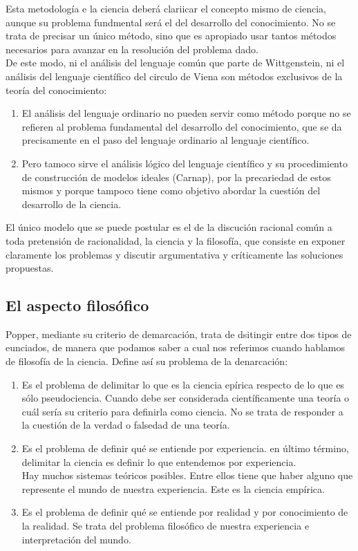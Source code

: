 \documentclass[a4paper, 11pt, twocolumn, spanish]{article}
\begin{document}
Esta metodología e la ciencia deberá clariicar el concepto mismo de
ciencia, aunque su problema fundmental será el del desarrollo del
conocimiento. No se trata de precisar un único método, sino que es
apropiado usar tantos métodos necesarios para avanzar en la resolución
del problema dado.\\
De este modo, ni el análisis del lenguaje común que parte de
Wittgenstein, ni el análisis del lenguaje científico del circulo de
Viena son métodos exclusivos de la teoría del conocimiento:
\begin{enumerate}
\item El análisis del lenguaje ordinario no pueden servir como método
porque no se refieren al problema fundamental del desarrollo del
conocimiento, que se da precisamente en el paso del lenguaje
ordinario al lenguaje científico.
\item Pero tamoco sirve el análisis lógico del lenguaje científico y su
procedimiento de construcción de modelos ideales (Carnap), por la
precariedad de estos mismos y porque tampoco tiene como objetivo
abordar la cuestión del desarrollo de la ciencia.
\end{enumerate}

El único modelo que se puede postular es el de la discución racional
común a toda pretensión de racionalidad, la ciencia y la filosofía,
que consiste en exponer claramente los problemas y discutir
argumentativa y críticamente las soluciones propuestas.

\subsection{El aspecto filosófico}
\label{sec:org365c198}
Popper, mediante su criterio de demarcación, trata de dsitingir entre
dos tipos de eunciados, de manera que podamos saber a cual nos
referimos cuando hablamos de filosofía de la ciencia. Define así su
problema de la denarcación:
\begin{enumerate}
\item Es el problema de delimitar lo que es la ciencia epírica respecto
de lo que es sólo pseudociencia. Cuando debe ser considerada
científicamente una teoría o cuál sería su criterio para
definirla como ciencia. No se trata de responder a la cuestión de
la verdad o falsedad de una teoría.
\item Es el problema de definir qué se entiende por experiencia. en
último término, delimitar la ciencia es definir lo que entendemos
por experiencia.\\
Hay muchos sistemas teóricos posibles. Entre ellos tiene que
haber alguno que represente el mundo de nuestra experiencia. Este
es la ciencia empírica.
\item Es el problema de definir qué se entiende por realidad y por
conocimiento de la realidad. Se trata del problema filosófico de
nuestra experiencia e interpretación del mundo.
\end{enumerate}
\end{document}
